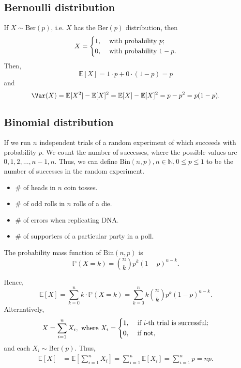 \subsection{Bernoulli distribution}
\begin{definition}
    If \(X \sim \mathrm{Ber}(p) \), i.e. \(X\) has the \(\mathrm{Ber}(p) \) distribution, then 
    \[
        X = \begin{dcases}
            1, &\text{ with probability } p ;\\
            0, &\text{ with probability } 1-p .
        \end{dcases}
    \]
    Then, 
    \[
        \mathbb{E} [X] = 1 \cdot p + 0 \cdot (1 - p) = p
    \]    
    and 
    \[
        \Var(X) = \mathbb{E} [X^2] - \mathbb{E} [X]^2 = \mathbb{E} [X] - \mathbb{E} [X]^2 = p - p^2 = p(1 - p).
    \]
\end{definition}

\subsection{Binomial distribution}
\begin{definition}
    If we run \(n\) independent trials of a random experiment of which succeeds with probability \(p\). We count the number of successes, where the possible values are \(0, 1, 2, \dots , n - 1, n\). Thus, we can define \(\mathrm{Bin}(n, p), n \in \mathbb{N} , 0 \le p \le 1 \) to be the number of successes in the random experiment. 
\end{definition}

\begin{eg}
    \hfill
    \begin{itemize}
        \item \(\#\) of heads in \(n\) coin tosses. 
        \item \(\#\) of odd rolls in \(n\) rolls of a die. 
        \item \(\#\) of errors when replicating DNA. 
        \item \(\#\) of supporters of a particular party in a poll.      
    \end{itemize}
\end{eg}

The probability mass function of \(\mathrm{Bin}(n, p)\) is 
\[
    \mathbb{P} (X = k) = \binom{n}{k} p^k (1 - p)^{n - k}.
\] 

Hence,
\[
    \mathbb{E} [X] = \sum_{k=0}^n k \cdot \mathbb{P} (X = k) = \sum_{k=0}^n k \binom{n}{k} p^k (1 - p)^{n-k}.  
\]
Alternatively,
\[
    X = \sum_{i=1}^n X_i, \text{ where } X_i = \begin{dcases}
        1, &\text{ if } i \text{-th trial is successful}  ;\\
        0, &\text{ if not}  ,
    \end{dcases} 
\]
and each \(X_i \sim \mathrm{Ber}(p) \). Thus,
\begin{align*}
    \mathbb{E} [X] &= \mathbb{E} \left[ \sum_{i=1}^n X_i  \right] = \sum_{i=1}^n \mathbb{E} [X_i] = \sum_{i=1}^n p = np.   
\end{align*} 

